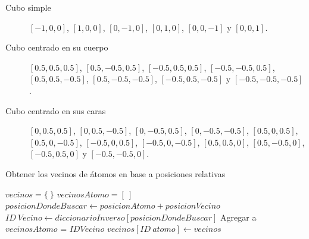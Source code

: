 \begin{description}
  \item [Cubo simple] $[-1,0,0]$, $[1,0,0]$, $[0,-1,0]$, $[0,1,0]$, $[0,0,-1]$ y $[0,0,1]$.
  \item [Cubo centrado en su cuerpo] $[0.5, 0.5, 0.5]$, $[0.5, -0.5, 0.5]$, $[-0.5, 0.5, 0.5]$, $[-0.5, -0.5, 0.5]$, $[0.5, 0.5, -0.5]$, $[0.5, -0.5, -0.5]$, $[-0.5, 0.5, -0.5]$ y $[-0.5, -0.5, -0.5]$.
  \item [Cubo centrado en sus caras] $[0, 0.5, 0.5]$, $[0, 0.5, -0.5]$, $[0, -0.5, 0.5]$, $[0, -0.5, -0.5]$, $[0.5, 0, 0.5]$, $[0.5, 0, -0.5]$, $[-0.5, 0, 0.5]$, $[-0.5, 0, -0.5]$, $[0.5, 0.5, 0]$, $[0.5, -0.5, 0]$, $[-0.5, 0.5, 0]$ y $[-0.5, -0.5, 0]$.
\end{description}

\begin{algorithm}[ht]
  \caption{Obtener los vecinos de átomos en base a posiciones relativas}
  \label{alg:findNeighborhood}
  \begin{algorithmic}[1]
    \STATE $vecinos = \{\ \}$ 
      \STATE $vecinosAtomo = [\ ]$ 
        \STATE $posicionDondeBuscar \leftarrow posicionAtomo + posicionVecino$
          \STATE $ID\ Vecino \leftarrow diccionarioInverso[posicionDondeBuscar]$
          \STATE Agregar a $vecinosAtomo$ = $ID Vecino$
        \ENDIF
      \ENDFOR
      \STATE $vecinos[ID\ atomo] \leftarrow vecinos$
    \ENDFOR
  \end{algorithmic}
\end{algorithm}







